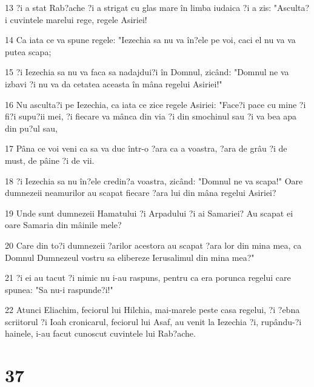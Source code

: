 \par 13 ?i a stat Rab?ache ?i a strigat cu glas mare în limba iudaica ?i a zis: "Asculta?i cuvintele marelui rege, regele Asiriei!
\par 14 Ca iata ce va spune regele: "Iezechia sa nu va în?ele pe voi, caci el nu va va putea scapa;
\par 15 ?i Iezechia sa nu va faca sa nadajdui?i în Domnul, zicând: "Domnul ne va izbavi ?i nu va da cetatea aceasta în mâna regelui Asiriei!"
\par 16 Nu asculta?i pe Iezechia, ca iata ce zice regele Asiriei: "Face?i pace cu mine ?i fi?i supu?ii mei, ?i fiecare va mânca din via ?i din smochinul sau ?i va bea apa din pu?ul sau,
\par 17 Pâna ce voi veni ca sa va duc într-o ?ara ca a voastra, ?ara de grâu ?i de must, de pâine ?i de vii.
\par 18 ?i Iezechia sa nu în?ele credin?a voastra, zicând: "Domnul ne va scapa!" Oare dumnezeii neamurilor au scapat fiecare ?ara lui din mâna regelui Asiriei?
\par 19 Unde sunt dumnezeii Hamatului ?i Arpadului ?i ai Samariei? Au scapat ei oare Samaria din mâinile mele?
\par 20 Care din to?i dumnezeii ?arilor acestora au scapat ?ara lor din mina mea, ca Domnul Dumnezeul vostru sa elibereze Ierusalimul din mina mea?"
\par 21 ?i ei au tacut ?i nimic nu i-au raspuns, pentru ca era porunca regelui care spunea: "Sa nu-i raspunde?i!"
\par 22 Atunci Eliachim, feciorul lui Hilchia, mai-marele peste casa regelui, ?i ?ebna scriitorul ?i Ioah cronicarul, feciorul lui Asaf, au venit la Iezechia ?i, rupându-?i hainele, i-au facut cunoscut cuvintele lui Rab?ache.

\chapter{37}

